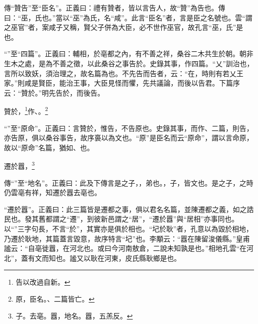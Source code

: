 {\noindent\zhuan{}\fzbyks 傳“贊告”至“臣名”。正義曰：禮有贊者，皆以言告人，故“贊”為告也。傳曰：“巫，氏也。”當以“巫”為氏，名“咸”。此言“臣名”者，言是臣之名號也。雲“謂之巫官”者，案咸子又稱，賢父子併為大臣，必不世作巫官，故孔言“巫，氏”是也。 \par}

{\noindent\shu{}\fzkt “”至“四篇”。正義曰：輔相，於亳都之內，有不善之祥，桑谷二木共生於朝。朝非生木之處，是為不善之徵，以此桑谷之事告於。史錄其事，作四篇。“乂”訓治也，言所以致妖，須治理之，故名篇為也。不先告而告者，云：“在，時則有若乂王家。”則咸是賢臣，能治王事，大臣見怪而懼，先共議論，而後以告君。下篇序云：“贊於。”明先告於，而後告。 \par}

贊於，\footnote{告以改過自新。}作、。\footnote{原，臣名。、二篇皆亡。}

{\noindent\shu{}\fzkt “”至“原命”。正義曰：言贊於，惟告，不告原也。史錄其事，而作、二篇，則告，亦告原，俱以桑谷事告，故序裛以為文也。“原”是臣名而云“原命”，謂以言命原，故以“原命”名篇，猶如、也。 \par}

遷於囂，\footnote{子。去亳。囂，地名。囂，五羔反。}

{\noindent\zhuan{}\fzbyks 傳“”至“地名”。正義曰：此及下傳言是之子，，弟也。，子，皆文也。是之子，之時仍雲亳有祥，知遷於囂去亳也。 \par}

{\noindent\shu{}\fzkt “遷於囂”。正義曰：此三篇皆是遷都之事，俱以君名名篇，並陳遷都之義，如之誥民也。發其舊都謂之“遷”，到彼新邑謂之“居”，“遷於囂”與“居相”亦事同也。以“”三字句長，不言“於”，其實亦是俱於相也。“圮於耿”者，孔意以為毀於相地，乃遷於耿地，其篇蓋言毀意，故序特言“圮”也。李顒云：“囂在陳留浚儀縣。”皇甫謐云：“自亳徙囂，在河北也。或曰今河南敖倉，二說未知孰是也。”相地孔雲“在河北”，蓋有文而知也。謐又以耿在河東，皮氏縣耿鄉是也。 \par}

